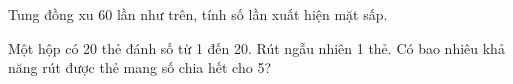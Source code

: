\begin{ex} %
Tung đồng xu 60 lần như trên, tính số lần xuất hiện mặt sấp.
\end{ex}

\begin{ex} %
Một hộp có 20 thẻ đánh số từ 1 đến 20. Rút ngẫu nhiên 1 thẻ. Có bao nhiêu khả năng rút được thẻ mang số chia hết cho 5?
\end{ex}
